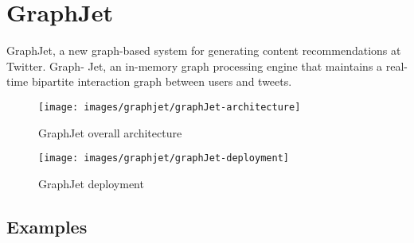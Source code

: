 \section{GraphJet}
\label{GraphJet}
GraphJet, a new graph-based system for generating content recommendations at Twitter. Graph-
Jet, an in-memory graph processing engine that maintains
a real-time bipartite interaction graph between users and
tweets. \cite{sharma2016graphjet}

\begin{figure}[!h]
	\centering
	\texttt{[image: images/graphjet/graphJet-architecture]}
	\caption{GraphJet overall architecture}
	\label{fig:graphJet-architecture}
\end{figure}

\begin{figure}[!h]
	\centering
	\texttt{[image: images/graphjet/graphJet-deployment]}
	\caption{GraphJet deployment}
	\label{fig:graphJet-deployment}
\end{figure}

\subsection{Examples}
